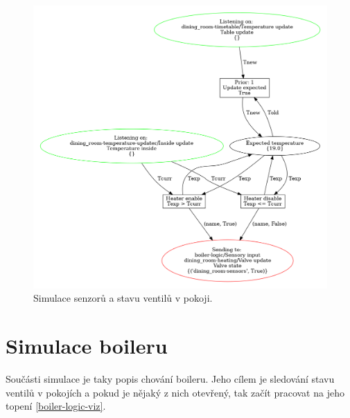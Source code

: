 \begin{figure}[htb]
 \centering
 \includegraphics[width=\textwidth]{obrazky-figures/room-sensors.png}
 \caption{Simulace senzorů a stavu ventilů v pokoji.}
 \label{sensor-viz}
\end{figure}


\section{Simulace boileru}
\label{sec:boiler-net-details}

Součásti simulace je taky popis chování boileru. Jeho cílem je sledování stavu ventilů v pokojích a pokud je nějaký z nich otevřený, tak začít pracovat na jeho topení \ref{boiler-logic-viz}.

